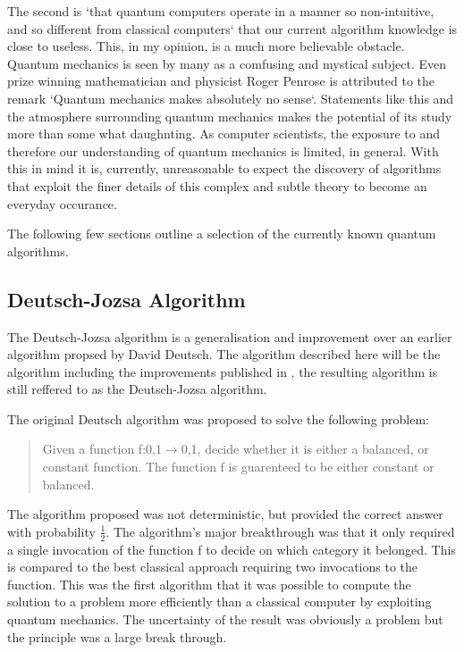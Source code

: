 \documentclass[authoryearcitations]{UoYCSproject}
\begin{document}
The second is `that quantum computers operate in a manner so non-intuitive, and so different from classical computers`\cite{Shor:2004:PQA:1032132.1032149} that our current algorithm knowledge is close to useless.
This, in my opinion, is a much more believable obstacle.
Quantum mechanics is seen by many as a comfusing and mystical subject.
Even prize winning mathematician and physicist Roger Penrose is attributed to the remark `Quantum mechanics makes absolutely no sense`.
Statements like this and the atmosphere surrounding quantum mechanics makes the potential of its study more than some what daughnting.
As computer scientists, the exposure to and therefore our understanding of quantum mechanics is limited, in general.
With this in mind it is, currently, unreasonable to expect the discovery of algorithms that exploit the finer details of this complex and subtle theory to become an everyday occurance.

The following few sections outline a selection of the currently known quantum algorithms.

\subsection{Deutsch-Jozsa Algorithm}
The Deutsch-Jozsa algorithm\cite{1992-deutsch} is a generalisation and improvement over an earlier algorithm propsed by David Deutsch\cite{Deutsch1985}.
The algorithm described here will be the algorithm including the improvements published in \cite{Macchiavello97quantumalgorithms}, the resulting algorithm is still reffered to as the Deutsch-Jozsa algorithm.

The original Deutsch algorithm\cite{Deutsch1985} was proposed to solve the following problem:
\begin{quote}
Given a function f:{0,1}$\to${0,1}, decide whether it is either a balanced, or constant function.
The function f is guarenteed to be either constant or balanced.
\end{quote}
The algorithm proposed was not deterministic, but provided the correct answer with probability $\frac{1}{2}$.
The algorithm's major breakthrough was that it only required a single invocation of the function f to decide on which category it belonged.
This is compared to the best classical approach requiring two invocations to the function.
This was the first algorithm that it was possible to compute the solution to a problem more efficiently than a classical computer by exploiting quantum mechanics.
The uncertainty of the result was obviously a problem but the principle was a large break through.
\end{document}
